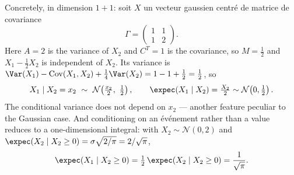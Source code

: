 \begin{example}
Concretely, in dimension $1 + 1$: soit $X$ un vecteur gaussien centré de matrice
de covariance
\[
  \Gamma = \begin{pmatrix} 1 & 1 \\ 1 & 2 \end{pmatrix} .
\]
Here $A = 2$ is the variance of $X_{2}$ and $C^{T} = 1$ is the covariance, so
$M = \tfrac{1}{2}$ and $X_{1} - \tfrac{1}{2}X_{2}$ is independent of $X_{2}$. Its
variance is
$\Var(X_{1}) - \Cov(X_{1},X_{2}) + \tfrac{1}{4}\Var(X_{2})
 = 1 - 1 + \tfrac{1}{2} = \tfrac{1}{2}$, so
\[
  X_{1} \mid X_{2} = x_{2} \ \sim\
  \mathcal{N}\!\left(\tfrac{x_{2}}{2},\ \tfrac{1}{2}\right) ,
  \qquad
  \expec(X_{1} \mid X_{2}) = \tfrac{X_{2}}{2} \sim \mathcal{N}\!\left(0,\tfrac{1}{2}\right) .
\]
The conditional variance does not depend on $x_{2}$ --- another feature peculiar
to the Gaussian case. And conditioning on an événement rather than a value reduces to
a one-dimensional integral: with $X_{2} \sim \mathcal{N}(0,2)$ and
$\expec(X_{2} \mid X_{2} \geq 0) = \sigma\sqrt{2/\pi} = 2/\sqrt{\pi}$,
\[
  \expec(X_{1} \mid X_{2} \geq 0)
    = \tfrac{1}{2}\,\expec(X_{2} \mid X_{2} \geq 0) = \frac{1}{\sqrt{\pi}} .
\]
\end{example}


